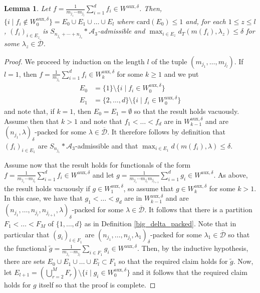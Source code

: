 \documentclass[12pt,a4paper]{amsart}
\theoremstyle{definition}
\theoremstyle{plain}
\newtheorem{lemma}[question]{Lemma}
\begin{document}
\begin{lemma}{\label{aux_lemma}}
Let $f=\frac{1}{m_{j_{1}}\cdots m_{j_{l}}}\sum_{i=1}^{d}f_{i}\in W^{\text{aux},\delta}$. Then, $\{ i \mid f_{i}\notin W^{\text{aux},\delta}_{0}\}=E_{0}\cup E_{1}\cup\ldots\cup E_{l}$ where $\mathrm{card}(E_0)\leq 1$ and, for each $1\leq z\leq l$, $(f_{i})_{i\in E_{z}}$ is $S_{n_{j_{1}}+\cdots+n_{j_{z}}}\ast\mathcal{A}_{3}$-admissible and $\max_{i\in E_{z}}d_{T}(m(f_{i}),\lambda_{z})\leq\delta$ for some $\lambda_{z}\in\overline{\mathcal{D}}$.
\end{lemma}
\begin{proof}
We proceed by induction on the length $l$ of the tuple $(m_{j_{1}},\ldots,m_{j_{l}})$. If $l=1$, then $f=\frac{1}{m_{j_{1}}}\sum_{i=1}^{d}f_{i}\in W^{\text{aux},\delta}_{k}$ for some $k\geq 1$ and we put 
\begin{align*}  E_{0}&=\{1\}\setminus\{ i \mid f_{i}\in W^{\text{aux},\delta}_{0}\} \\ E_{1}&=\{2,\ldots,d\}\setminus \{i \mid f_{i}\in W^{\text{aux},\delta}_{0}\} \end{align*}
and note that, if $k=1$, then $E_{0}=E_{1}=\emptyset$ so that the result holds vacuously. Assume then that $k> 1$ and note that $f_{1}<\ldots<f_{d}$ are in $W^{\text{aux},\delta}_{k-1}$ and are $(n_{j_{1}},\lambda)_{\delta}$-packed for some $\lambda\in\overline{\mathcal{D}}$. It therefore follows by definition that $(f_{i})_{i\in E_{1}}$ are $S_{n_{j_{1}}}\ast\mathcal{A}_{3}$-admissible and that $\max_{i\in E_{1}}d(m(f_{i}),\lambda)\leq \delta$.

Assume now that the result holds for functionals of the form $f=\frac{1}{m_{j_{1}}\cdots m_{j_{l}}}\sum_{i=1}^{d}f_{i}\in W^{\text{aux},\delta}$ and let $g=\frac{1}{m_{j_{1}}\cdots m_{j_{l}}m_{j_{l+1}}}\sum_{i=1}^{d}g_{i}\in W^{\text{aux},\delta}$. As above, the result holds vacuously if $g\in W^{\text{aux},\delta}_{1}$, so assume that $g\in W^{\text{aux},\delta}_{k}$ for some $k>1$. In this case, we have that $g_{1}<\ldots<g_{d}$ are in $W^{\text{aux},\delta}_{k-1}$ and are $(n_{j_{1}},\ldots,n_{j_{l}},n_{j_{l+1}},\lambda)_{\delta}$-packed for some $\lambda\in\overline{\mathcal{D}}$. It follows that there is a partition $F_{1}<\ldots<F_{M}$ of $\{1,\ldots,d\}$ as in Definition \ref{big_delta_packed}. Note that in particular that $(g_{i})_{i\in F_{1}}$ are $(n_{j_{1}},\ldots,n_{j_{l}},\lambda_{1})_{\delta}$-packed for some $\lambda_{1}\in\overline{\mathcal{D}}$ so that the functional $\tilde{g}=\frac{1}{m_{j_{1}}\cdots m_{j_{l}}}\sum_{i\in F_{1}}g_{i}\in W^{\text{aux},\delta}$. Then, by the inductive hypothesis, there are sets $E_{0}\cup E_{1}\cup\ldots\cup E_{l}\subset F_{1}$ so that the required claim holds for $\tilde{g}$. Now, let $E_{l+1}=\left(\bigcup_{r=2}^{M}F_{r}\right)\setminus\{ i \mid g_{i}\in W^{\text{aux},\delta}_{0}\}$ and it follows that the required claim holds for $g$ itself so that the proof is complete.
\end{proof}
\end{document}
